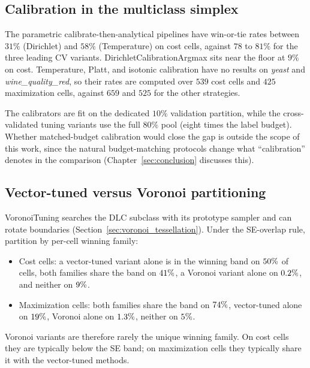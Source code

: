 

\subsection{Calibration in the multiclass simplex}

The parametric calibrate-then-analytical pipelines have win-or-tie rates between $31\%$ (Dirichlet) and $58\%$ (Temperature) on cost cells, against $78$ to $81\%$ for the three leading CV variants. DirichletCalibrationArgmax sits near the floor at $9\%$ on cost. Temperature, Platt, and isotonic calibration have no results on \textit{yeast} and \textit{wine\_quality\_red}, so their rates are computed over $539$ cost cells and $425$ maximization cells, against $659$ and $525$ for the other strategies.

The calibrators are fit on the dedicated $10\%$ validation partition, while the cross-validated tuning variants use the full $80\%$ pool (eight times the label budget). Whether matched-budget calibration would close the gap is outside the scope of this work, since the natural budget-matching protocols change what ``calibration'' denotes in the comparison (Chapter~\ref{sec:conclusion} discusses this).



\subsection{Vector-tuned versus Voronoi partitioning}

VoronoiTuning searches the DLC subclass with its prototype sampler and can rotate boundaries (Section~\ref{sec:voronoi_tessellation}). Under the SE-overlap rule, partition by per-cell winning family:
\begin{itemize}
    \item Cost cells: a vector-tuned variant alone is in the winning band on $50\%$ of cells, both families share the band on $41\%$, a Voronoi variant alone on $0.2\%$, and neither on $9\%$.
    \item Maximization cells: both families share the band on $74\%$, vector-tuned alone on $19\%$, Voronoi alone on $1.3\%$, neither on $5\%$.
\end{itemize}
Voronoi variants are therefore rarely the unique winning family. On cost cells they are typically below the SE band; on maximization cells they typically share it with the vector-tuned methods.

